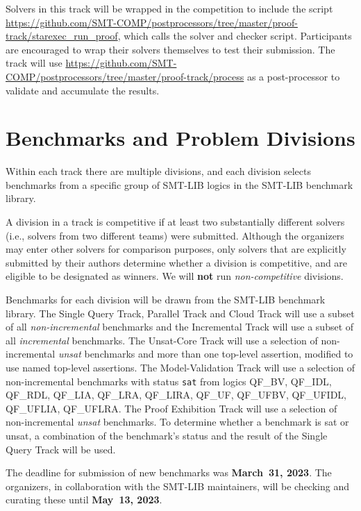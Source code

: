 \documentclass[12pt]{article}
\newcommand{\maintrack}{Single Query Track\xspace}
\newcommand{\inctrack}{Incremental Track\xspace}
\newcommand{\ucoretrack}{Unsat-Core Track\xspace}
\newcommand{\mvaltrack}{Model-Validation Track\xspace}
\newcommand{\challtrack}{Industry-Challenge Track\xspace}
\newcommand{\paralleltrack}{Parallel Track\xspace}
\newcommand{\cloudtrack}{Cloud Track\xspace}
\newcommand{\prooftrack}{Proof Exhibition Track\xspace}
\begin{document}
Solvers in this track will be wrapped in the competition to include the script
{\url{https://github.com/SMT-COMP/postprocessors/tree/master/proof-track/starexec_run_proof}},
which calls the solver and checker script.
Participants are encouraged to wrap their solvers themselves to test
their submission.
The track will use
{\url{https://github.com/SMT-COMP/postprocessors/tree/master/proof-track/process}}
as a post-processor
to validate and accumulate the results.


\section{Benchmarks and Problem Divisions}

%
Within each track there are multiple divisions, and each division selects
benchmarks from a specific group of SMT-LIB logics in the SMT-LIB benchmark
library.

A division in a track is competitive if at least two substantially
different solvers (i.e., solvers from two different teams) were
submitted.  Although the organizers may enter other solvers for
comparison purposes, only solvers that are explicitly submitted by
their authors determine whether a division is competitive, and are
eligible to be designated as winners.
We will \textbf{not} run \emph{non-competitive} divisions.

Benchmarks for each division will be drawn from the SMT-LIB benchmark
library.  The \maintrack, \paralleltrack{} and \cloudtrack{} will use a
subset of all \emph{non-incremental} benchmarks and the \inctrack will
use a subset of all \emph{incremental} benchmarks.
%
%
The \ucoretrack will use a selection of non-incremental
\emph{unsat} benchmarks
and more than one top-level assertion, modified to use named
top-level assertions.  The \mvaltrack will use a selection of non-incremental
benchmarks with status \texttt{sat} from logics QF\_BV, QF\_IDL, QF\_RDL,
QF\_LIA, QF\_LRA, QF\_LIRA, QF\_UF, QF\_UFBV, QF\_UFIDL, QF\_UFLIA, QF\_UFLRA.
The \prooftrack will use a selection of non-incremental
\emph{unsat} benchmarks.
To determine whether a benchmark is sat or unsat, a combination of
the benchmark's status and the result of the \maintrack{} will be used.


The deadline for submission of new benchmarks was {\bf March~31, 2023}.
%
The organizers, in collaboration with the SMT-LIB maintainers, will be
checking and curating these until {\bf May~13, 2023}.
\end{document}
